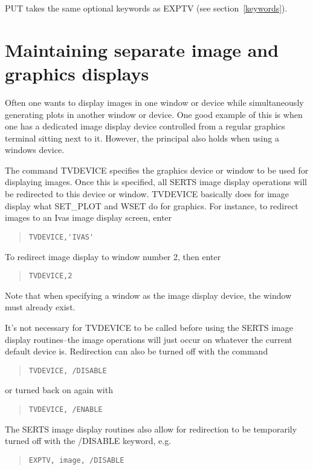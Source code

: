 PUT takes the same optional keywords as EXPTV (see section~\ref{keywords}).

\section{Maintaining separate image and graphics displays}
\label{tvdevice}

Often one wants to display images in one window or device while simultaneously
generating plots in another window or device.  One good example of this is when
one has a dedicated image display device controlled from a regular graphics
terminal sitting next to it.  However, the principal also holds when using a
windows device.

The command TVDEVICE specifies the graphics device or window to be used for
displaying images.  Once this is specified, all SERTS image display operations
will be redirected to this device or window.  TVDEVICE basically does for image
display what SET\_PLOT and WSET do for graphics.  For instance, to redirect
images to an Ivas image display screen, enter
\begin{quote}
\begin{verbatim}
TVDEVICE,'IVAS'
\end{verbatim}
\end{quote}
To redirect image display to window number 2, then enter
\begin{quote}
\begin{verbatim}
TVDEVICE,2
\end{verbatim}
\end{quote}
Note that when specifying a window as the image display device, the window must
already exist.

It's not necessary for TVDEVICE to be called before using the SERTS image
display routines--the image operations will just occur on whatever the current
default device is.  Redirection can also be turned off with the command
\begin{quote}
\begin{verbatim}
TVDEVICE, /DISABLE
\end{verbatim}
\end{quote}
or turned back on again with
\begin{quote}
\begin{verbatim}
TVDEVICE, /ENABLE
\end{verbatim}
\end{quote}
The SERTS image display routines also allow for redirection to be temporarily
turned off with the /DISABLE keyword, e.g.
\begin{quote}
\begin{verbatim}
EXPTV, image, /DISABLE
\end{verbatim}
\end{quote}

